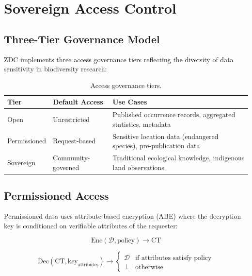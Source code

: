 \documentclass[11pt,a4paper]{article}
\begin{document}
\section{Sovereign Access Control}
\label{sec:access}

\subsection{Three-Tier Governance Model}

ZDC implements three access governance tiers reflecting the diversity of data sensitivity in biodiversity research:

\begin{table}[H]
\centering
\caption{Access governance tiers.}
\label{tab:access_tiers}
\begin{tabularx}{\textwidth}{@{}llX@{}}
\toprule
\textbf{Tier} & \textbf{Default Access} & \textbf{Use Cases} \\
\midrule
Open & Unrestricted & Published occurrence records, aggregated statistics, metadata \\
Permissioned & Request-based & Sensitive location data (endangered species), pre-publication data \\
Sovereign & Community-governed & Traditional ecological knowledge, indigenous land observations \\
\bottomrule
\end{tabularx}
\end{table}

\subsection{Permissioned Access}

Permissioned data uses attribute-based encryption (ABE) where the decryption key is conditioned on verifiable attributes of the requester:

\begin{equation}
    \text{Enc}(\mathcal{D}, \text{policy}) \rightarrow \text{CT}
\end{equation}

\begin{equation}
    \text{Dec}(\text{CT}, \text{key}_{\text{attributes}}) \rightarrow \begin{cases} \mathcal{D} & \text{if attributes satisfy policy} \\ \perp & \text{otherwise} \end{cases}
\end{equation}
\end{document}
